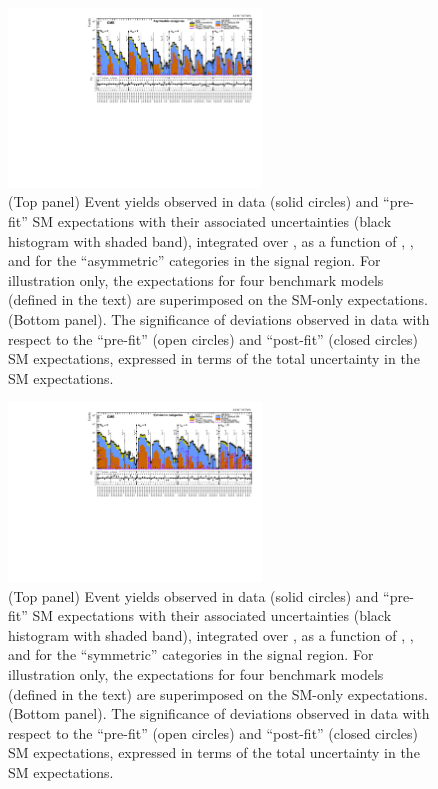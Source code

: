\begin{figure}[!h]
  \begin{center}
    \includegraphics[angle=90,width=0.6\textwidth]{figures/result/summaryPlot_Asymmetric_prefit_overlay_fit_b}
    \caption{(Top panel) Event yields observed in data (solid circles)
      and ``pre-fit'' SM expectations with their associated
      uncertainties (black histogram with shaded band), integrated
      over \HTmiss, as a function of \njet, \nb, and \scalht for the
      ``asymmetric'' \njet categories in the signal region. For
      illustration only, the expectations for four benchmark models
      (defined in the text) are superimposed on the SM-only
      expectations. (Bottom panel). The significance of deviations
      observed in data with respect to the ``pre-fit'' (open circles)
      and ``post-fit'' (closed circles) SM expectations, expressed in
      terms of the total uncertainty in the SM expectations.  }
    \label{fig:asym}
  \end{center}
\end{figure}

\begin{figure}[!h]
  \begin{center}
    \includegraphics[angle=90,width=0.6\textwidth]{figures/result/summaryPlot_Symmetric_prefit_overlay_fit_b}
    \caption{(Top panel) Event yields observed in data (solid circles)
      and ``pre-fit'' SM expectations with their associated
      uncertainties (black histogram with shaded band), integrated
      over \HTmiss, as a function of \njet, \nb, and \scalht for the
      ``symmetric'' \njet categories in the signal region. For
      illustration only, the expectations for four benchmark models
      (defined in the text) are superimposed on the SM-only
      expectations. (Bottom panel). The significance of deviations
      observed in data with respect to the ``pre-fit'' (open circles)
      and ``post-fit'' (closed circles) SM expectations, expressed in
      terms of the total uncertainty in the SM expectations. }
    \label{fig:sym}
  \end{center}
\end{figure}

